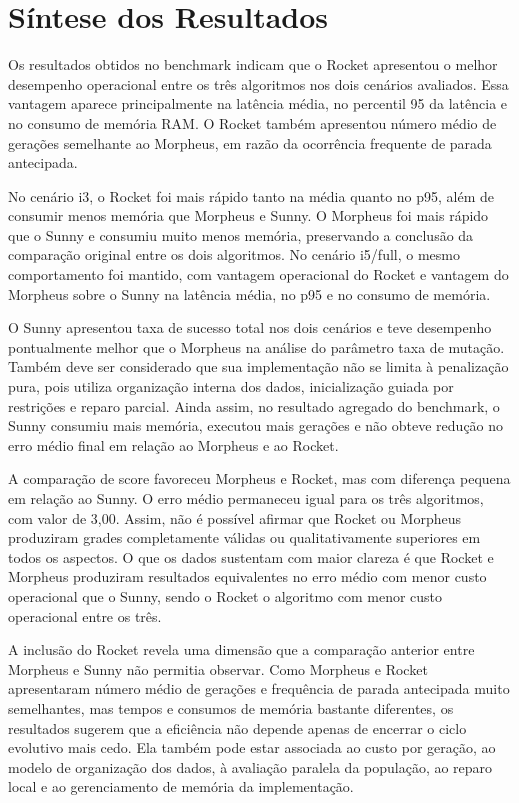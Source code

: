 \section{Síntese dos Resultados}
\label{sec:sintese-resultados}

Os resultados obtidos no benchmark indicam que o Rocket apresentou o melhor desempenho operacional entre os três algoritmos nos dois cenários avaliados. Essa vantagem aparece principalmente na latência média, no percentil 95 da latência e no consumo de memória RAM. O Rocket também apresentou número médio de gerações semelhante ao Morpheus, em razão da ocorrência frequente de parada antecipada.

No cenário i3, o Rocket foi mais rápido tanto na média quanto no p95, além de consumir menos memória que Morpheus e Sunny. O Morpheus foi mais rápido que o Sunny e consumiu muito menos memória, preservando a conclusão da comparação original entre os dois algoritmos. No cenário i5/full, o mesmo comportamento foi mantido, com vantagem operacional do Rocket e vantagem do Morpheus sobre o Sunny na latência média, no p95 e no consumo de memória.

O Sunny apresentou taxa de sucesso total nos dois cenários e teve desempenho pontualmente melhor que o Morpheus na análise do parâmetro taxa de mutação. Também deve ser considerado que sua implementação não se limita à penalização pura, pois utiliza organização interna dos dados, inicialização guiada por restrições e reparo parcial. Ainda assim, no resultado agregado do benchmark, o Sunny consumiu mais memória, executou mais gerações e não obteve redução no erro médio final em relação ao Morpheus e ao Rocket.

A comparação de score favoreceu Morpheus e Rocket, mas com diferença pequena em relação ao Sunny. O erro médio permaneceu igual para os três algoritmos, com valor de 3,00. Assim, não é possível afirmar que Rocket ou Morpheus produziram grades completamente válidas ou qualitativamente superiores em todos os aspectos. O que os dados sustentam com maior clareza é que Rocket e Morpheus produziram resultados equivalentes no erro médio com menor custo operacional que o Sunny, sendo o Rocket o algoritmo com menor custo operacional entre os três.

A inclusão do Rocket revela uma dimensão que a comparação anterior entre Morpheus e Sunny não permitia observar. Como Morpheus e Rocket apresentaram número médio de gerações e frequência de parada antecipada muito semelhantes, mas tempos e consumos de memória bastante diferentes, os resultados sugerem que a eficiência não depende apenas de encerrar o ciclo evolutivo mais cedo. Ela também pode estar associada ao custo por geração, ao modelo de organização dos dados, à avaliação paralela da população, ao reparo local e ao gerenciamento de memória da implementação.

